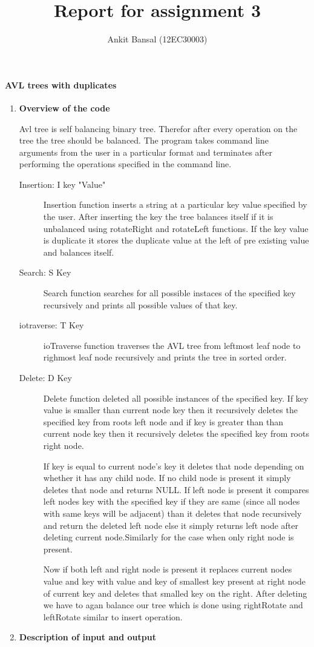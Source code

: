 \documentclass[a4paper,11pt]{article}
\title{Report for assignment 3}
\author{Ankit Bansal (12EC30003)}
\begin{document}
\maketitle

\paragraph{AVL trees with duplicates}
\begin{enumerate}
 \item \textbf{Overview of the code}

Avl tree is self balancing binary tree. Therefor after every operation on the tree the tree should be balanced. The program takes command line arguments from the user in a particular format and terminates after performing the operations specified in the command line.
\begin{description}
  \item[Insertion: I key "Value"]
 Insertion function inserts a string at a particular key value specified by the user. After inserting the key the tree balances itself if it is unbalanced using rotateRight and rotateLeft functions. If the key value is duplicate it stores the duplicate value at the left of pre existing value and balances itself.
  \item[Search: S Key]
Search function searches for all possible instaces of the specified key recursively and prints all  possible values of that key.
  \item[iotraverse: T Key]
ioTraverse function traverses the AVL tree from leftmost leaf node to righmost leaf node recursively and prints the tree in sorted order.
  \item[Delete: D Key]
Delete function deleted all possible instances of the specified key. If key value is smaller than current node key then it recursively deletes the specified key from roots left  node and if key is greater than  than current node key then it recursively deletes the specified key from roots right  node. 

If key is equal to current node's key it deletes that node depending on whether it has any child node. If no child node is present it simply deletes that node and returns NULL. If left node is present it compares left nodes key with the specified key if they are same (since all nodes with same keys will be adjacent) than it deletes that node recursively and return the deleted left node else it simply returns left node after deleting current node.Similarly for the case when only right node is  present.

Now if both left and right node is present it replaces current nodes value and key with value and key of  smallest key present at right node of current key and deletes that smalled key on the right. After deleting we have to agan balance our tree which is done using rightRotate and leftRotate similar to insert operation.
\end{description}
 \item \textbf{Description of input and output}
\end{enumerate}
\end{document}
